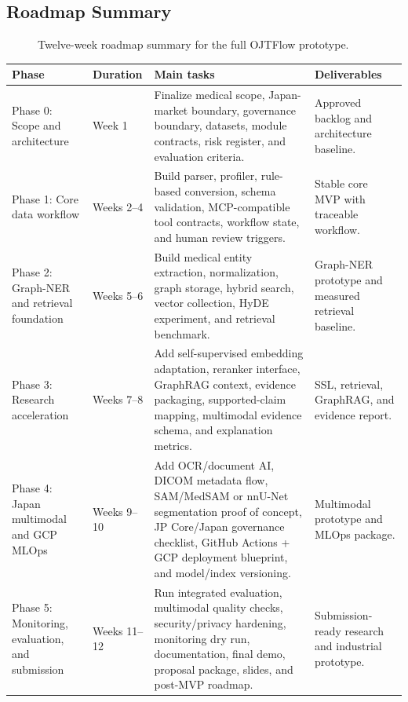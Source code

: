 \subsection{Roadmap Summary}

\begin{figure}[H]
  \centering
  
  \caption{Twelve-week roadmap summary for the full OJTFlow prototype.}
  \label{fig:roadmap}
\end{figure}

\begin{longtable}{p{}p{}p{}p{}}
\toprule
\textbf{Phase} & \textbf{Duration} & \textbf{Main tasks} & \textbf{Deliverables} \\
\midrule
Phase 0: Scope and architecture & Week 1 & Finalize medical scope, Japan-market boundary, governance boundary, datasets, module contracts, risk register, and evaluation criteria. & Approved backlog and architecture baseline. \\
Phase 1: Core data workflow & Weeks 2--4 & Build parser, profiler, rule-based conversion, schema validation, MCP-compatible tool contracts, workflow state, and human review triggers. & Stable core MVP with traceable workflow. \\
Phase 2: Graph-NER and retrieval foundation & Weeks 5--6 & Build medical entity extraction, normalization, graph storage, hybrid search, vector collection, HyDE experiment, and retrieval benchmark. & Graph-NER prototype and measured retrieval baseline. \\
Phase 3: Research acceleration & Weeks 7--8 & Add self-supervised embedding adaptation, reranker interface, GraphRAG context, evidence packaging, supported-claim mapping, multimodal evidence schema, and explanation metrics. & SSL, retrieval, GraphRAG, and evidence report. \\
Phase 4: Japan multimodal and GCP MLOps & Weeks 9--10 & Add OCR/document AI, DICOM metadata flow, SAM/MedSAM or nnU-Net segmentation proof of concept, JP Core/Japan governance checklist, GitHub Actions + GCP deployment blueprint, and model/index versioning. & Multimodal prototype and MLOps package. \\
Phase 5: Monitoring, evaluation, and submission & Weeks 11--12 & Run integrated evaluation, multimodal quality checks, security/privacy hardening, monitoring dry run, documentation, final demo, proposal package, slides, and post-MVP roadmap. & Submission-ready research and industrial prototype. \\
\bottomrule
\end{longtable}

